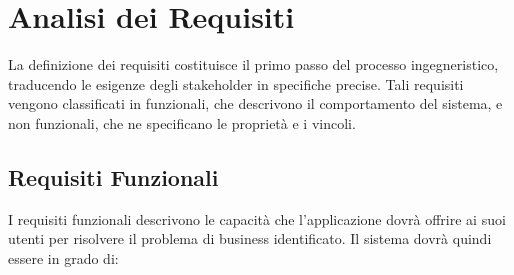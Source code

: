 \documentclass[12pt,a4paper,openright,twoside]{book}
\begin{document}
\section{Analisi dei Requisiti}
\label{sec:analisi_requisiti}
La definizione dei requisiti costituisce il primo passo del processo ingegneristico, traducendo le esigenze degli stakeholder in specifiche precise. Tali requisiti vengono classificati in funzionali, che descrivono il comportamento del sistema, e non funzionali, che ne specificano le proprietà e i vincoli.

\subsection{Requisiti Funzionali}
\label{subsec:req_funzionali}
I requisiti funzionali descrivono le capacità che l'applicazione dovrà offrire ai suoi utenti per risolvere il problema di business identificato. Il sistema dovrà quindi essere in grado di:
\end{document}

